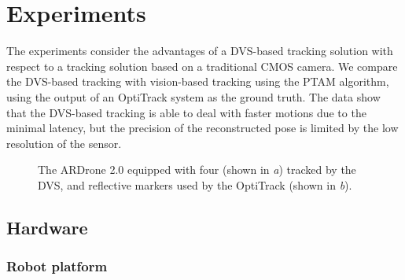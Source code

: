
\section{Experiments\label{sec:experiments}}

The experiments consider the advantages of a DVS-based tracking solution
with respect to a tracking solution based on a traditional CMOS camera.
We compare the DVS-based \ALM tracking with vision-based tracking
using the PTAM algorithm, using the output of an OptiTrack system
as the ground truth. The data show that the DVS-based tracking is
able to deal with faster motions due to the minimal latency, but the
precision of the reconstructed pose is limited by the low resolution
of the sensor.



\begin{figure}[b]
\centering{}\hfill{}\hfill{}\hfill{} \caption{\label{fig:marked_quadrotor}The ARDrone 2.0 equipped with four \ALMs
(shown in \emph{a}) tracked by the DVS, and reflective markers used
by the OptiTrack (shown in \emph{b}). }
\end{figure}



\subsection{Hardware}


\subsubsection{Robot platform}

